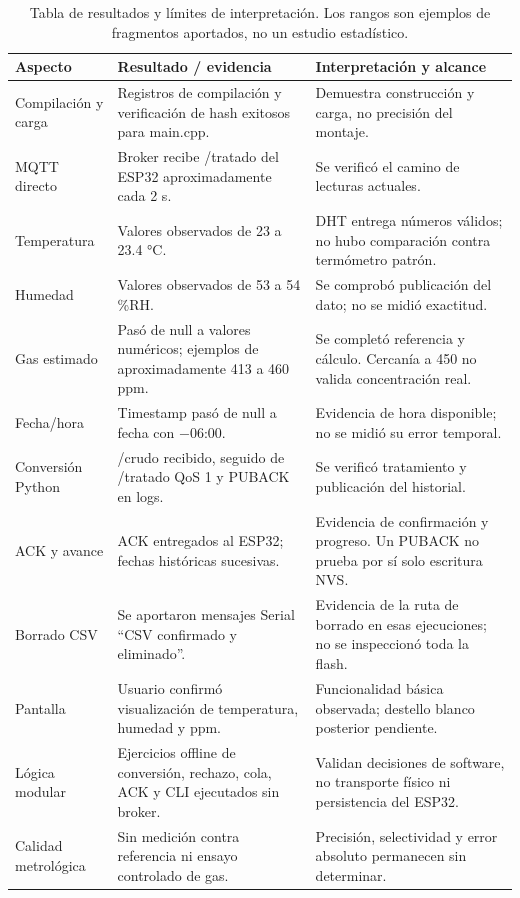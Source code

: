\documentclass[11pt,a4paper]{article}
\begin{document}
\begin{table}[h!]
\footnotesize
\begin{tabularx}{\linewidth}{@{}P{26mm}P{49mm}Y@{}}
\toprule
\textbf{Aspecto} & \textbf{Resultado / evidencia} & \textbf{Interpretación y alcance}\\\midrule
Compilación y carga & Registros de compilación y verificación de hash exitosos para main.cpp. & Demuestra construcción y carga, no precisión del montaje.\\
MQTT directo & Broker recibe /tratado del ESP32 aproximadamente cada 2 s. & Se verificó el camino de lecturas actuales.\\
Temperatura & Valores observados de 23 a 23.4 °C. & DHT entrega números válidos; no hubo comparación contra termómetro patrón.\\
Humedad & Valores observados de 53 a 54 \%RH. & Se comprobó publicación del dato; no se midió exactitud.\\
Gas estimado & Pasó de null a valores numéricos; ejemplos de aproximadamente 413 a 460 ppm. & Se completó referencia y cálculo. Cercanía a 450 no valida concentración real.\\
Fecha/hora & Timestamp pasó de null a fecha con $-$06:00. & Evidencia de hora disponible; no se midió su error temporal.\\
Conversión Python & /crudo recibido, seguido de /tratado QoS 1 y PUBACK en logs. & Se verificó tratamiento y publicación del historial.\\
ACK y avance & ACK entregados al ESP32; fechas históricas sucesivas. & Evidencia de confirmación y progreso. Un PUBACK no prueba por sí solo escritura NVS.\\
Borrado CSV & Se aportaron mensajes Serial ``CSV confirmado y eliminado''. & Evidencia de la ruta de borrado en esas ejecuciones; no se inspeccionó toda la flash.\\
Pantalla & Usuario confirmó visualización de temperatura, humedad y ppm. & Funcionalidad básica observada; destello blanco posterior pendiente.\\
Lógica modular & Ejercicios offline de conversión, rechazo, cola, ACK y CLI ejecutados sin broker. & Validan decisiones de software, no transporte físico ni persistencia del ESP32.\\
Calidad metrológica & Sin medición contra referencia ni ensayo controlado de gas. & Precisión, selectividad y error absoluto permanecen sin determinar.\\
\bottomrule
\end{tabularx}
\caption{Tabla de resultados y límites de interpretación. Los rangos son ejemplos de fragmentos aportados, no un estudio estadístico.}
\end{table}
\end{document}
